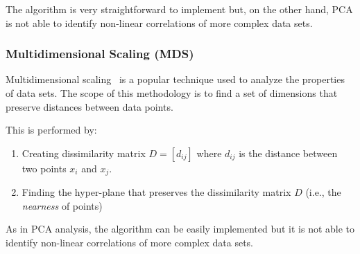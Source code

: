 The algorithm is very straightforward to implement but, on the other hand, PCA is not able to identify non-linear correlations of more complex data sets.


\subsubsection{Multidimensional Scaling (MDS)}
\label{mds}

Multidimensional scaling~\cite{MDS} is a popular technique used to analyze the properties of data sets. The scope of this methodology is to find a set of dimensions that preserve distances between data points.

This is performed by:
\begin{enumerate}
  \item Creating dissimilarity matrix $D=[d_{ij}]$ where $d_{ij}$ is the distance between two points $x_i$ and $x_j$.
  \item Finding the hyper-plane that preserves the dissimilarity matrix $D$ (i.e., the \emph{nearness} of points)
\end{enumerate}

As in PCA analysis, the algorithm can be easily implemented but it is not able to identify non-linear correlations of more complex data sets.

